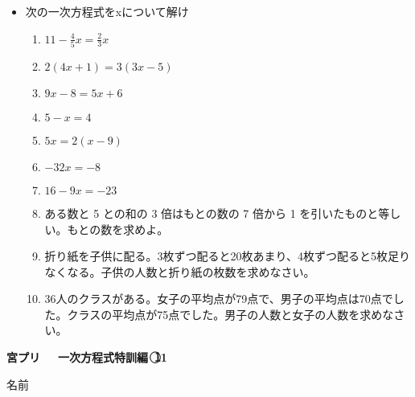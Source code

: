 \documentclass[a4paper,fleqn,papersize,15pt]{jsarticle}
\begin{document}
 \begin{itemize}
   \item 次の一次方程式をxについて解け
   \begin{enumerate}
\item $11- \frac{4}{5} x= \frac{2}{3} x$ \begin{flushright}\framebox[8em]{\rule{0pt}{6ex}}\end{flushright} %
\item $2(4x+1)=3(3x-5)$ \begin{flushright}\framebox[8em]{\rule{0pt}{6ex}}\end{flushright} %
\item $9x-8=5x+6$ \begin{flushright}\framebox[8em]{\rule{0pt}{6ex}}\end{flushright} %
\item $5-x=4$ \begin{flushright}\framebox[8em]{\rule{0pt}{6ex}}\end{flushright} %
\item $5x=2(x-9)$ \begin{flushright}\framebox[8em]{\rule{0pt}{6ex}}\end{flushright} %
\item $-32x=-8$ \begin{flushright}\framebox[8em]{\rule{0pt}{6ex}}\end{flushright} %
\item $16-9x=-23$ \begin{flushright}\framebox[8em]{\rule{0pt}{6ex}}\end{flushright} %
\item ある数と 5 との和の 3 倍はもとの数の 7 倍から 1 を引いたものと等しい。もとの数を求めよ。 \vfill \begin{flushright}\framebox[8em]{\rule{0pt}{6ex}}\end{flushright} %
\item 折り紙を子供に配る。3枚ずつ配ると20枚あまり、4枚ずつ配ると5枚足りなくなる。子供の人数と折り紙の枚数を求めなさい。 \vfill \begin{flushright}\framebox[8em]{\rule{0pt}{6ex}}\end{flushright} %
\item 36人のクラスがある。女子の平均点が79点で、男子の平均点は70点でした。クラスの平均点が75点でした。男子の人数と女子の人数を求めなさい。 \vfill \begin{flushright}\framebox[8em]{\rule{0pt}{6ex}}\end{flushright} %
\end{enumerate}
    \vfill
\end{itemize}
\clearpage
 \begin{center}
   \LARGE\textbf{宮プリ　~一次方程式特訓編~\textcircled{\scriptsize 11}}
     \begin{flushright}
       名前\underline{\hspace{8zw}}
     \end{flushright}
 \end{center}
\end{document}

